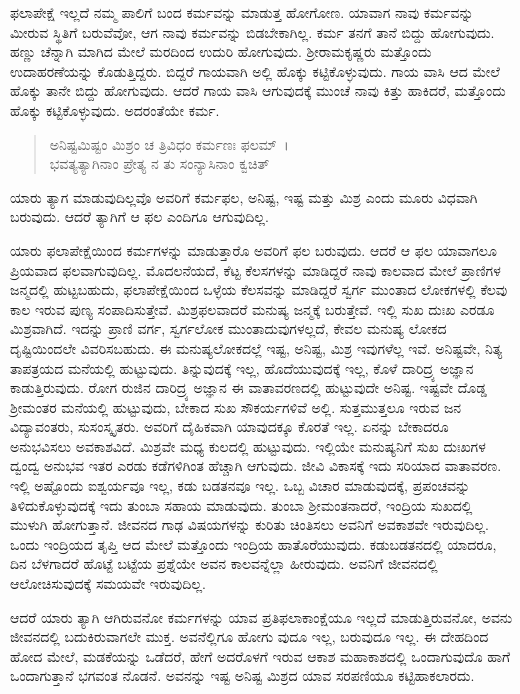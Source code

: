 ಫಲಾಪೇಕ್ಷೆ ಇಲ್ಲದೆ ನಮ್ಮ ಪಾಲಿಗೆ ಬಂದ ಕರ್ಮವನ್ನು ಮಾಡುತ್ತ ಹೋಗೋಣ. ಯಾವಾಗ ನಾವು ಕರ್ಮವನ್ನು ಮೀರುವ ಸ್ಥಿತಿಗೆ ಬರುವೆವೋ, ಆಗ ನಾವು ಕರ್ಮವನ್ನು ಬಿಡಬೇಕಾಗಿಲ್ಲ. ಕರ್ಮ ತನಗೆ ತಾನೆ ಬಿದ್ದು ಹೋಗುವುದು. ಹಣ್ಣು ಚೆನ್ನಾಗಿ ಮಾಗಿದ ಮೇಲೆ ಮರದಿಂದ ಉದುರಿ ಹೋಗುವುದು. ಶ‍್ರೀರಾಮಕೃಷ್ಣರು ಮತ್ತೊಂದು ಉದಾಹರಣೆಯನ್ನು ಕೊಡುತ್ತಿದ್ದರು. ಬಿದ್ದರೆ ಗಾಯವಾಗಿ ಅಲ್ಲಿ ಹೊಕ್ಕು ಕಟ್ಟಿಕೊಳ್ಳುವುದು. ಗಾಯ ವಾಸಿ ಆದ ಮೇಲೆ ಹೊಕ್ಕು ತಾನೇ ಬಿದ್ದು ಹೋಗುವುದು. ಆದರೆ ಗಾಯ ವಾಸಿ ಆಗುವುದಕ್ಕೆ ಮುಂಚೆ ನಾವು ಕಿತ್ತು ಹಾಕಿದರೆ, ಮತ್ತೊಂದು ಹೊಕ್ಕು ಕಟ್ಟಿಕೊಳ್ಳುವುದು. ಅದರಂತೆಯೇ ಕರ್ಮ.

\begin{verse}
ಅನಿಷ್ಟಮಿಷ್ಟಂ ಮಿಶ್ರಂ ಚ ತ್ರಿವಿಧಂ ಕರ್ಮಣಃ ಫಲಮ್~।\\ಭವತ್ಯತ್ಯಾಗಿನಾಂ ಪ್ರೇತ್ಯ ನ ತು ಸಂನ್ಯಾಸಿನಾಂ ಕ್ವಚಿತ್ 
\end{verse}

{\small ಯಾರು ತ್ಯಾಗ ಮಾಡುವುದಿಲ್ಲವೊ ಅವರಿಗೆ ಕರ್ಮಫಲ, ಅನಿಷ್ಟ, ಇಷ್ಟ ಮತ್ತು ಮಿಶ್ರ ಎಂದು ಮೂರು ವಿಧವಾಗಿ ಬರುವುದು. ಆದರೆ ತ್ಯಾಗಿಗೆ ಆ ಫಲ ಎಂದಿಗೂ ಆಗುವುದಿಲ್ಲ.}

ಯಾರು ಫಲಾಪೇಕ್ಷೆಯಿಂದ ಕರ್ಮಗಳನ್ನು ಮಾಡುತ್ತಾರೊ ಅವರಿಗೆ ಫಲ ಬರುವುದು. ಆದರೆ ಆ ಫಲ ಯಾವಾಗಲೂ ಪ್ರಿಯವಾದ ಫಲವಾಗುವುದಿಲ್ಲ. ಮೊದಲನೆಯದೆ, ಕೆಟ್ಟ ಕೆಲಸಗಳನ್ನು ಮಾಡಿದ್ದರೆ ನಾವು ಕಾಲವಾದ ಮೇಲೆ ಪ್ರಾಣಿಗಳ ಜನ್ಮದಲ್ಲಿ ಹುಟ್ಟಬಹುದು, ಫಲಾಪೇಕ್ಷೆಯಿಂದ ಒಳ್ಳೆಯ ಕೆಲಸವನ್ನು ಮಾಡಿದ್ದರೆ ಸ್ವರ್ಗ ಮುಂತಾದ ಲೋಕಗಳಲ್ಲಿ ಕೆಲವು ಕಾಲ ಇರುವ ಪುಣ್ಯ ಸಂಪಾದಿಸುತ್ತೇವೆ. ಮಿಶ್ರಫಲವಾದರೆ ಮನುಷ್ಯ ಜನ್ಮಕ್ಕೆ ಬರುತ್ತೇವೆ. ಇಲ್ಲಿ ಸುಖ ದುಃಖ ಎರಡೂ ಮಿಶ್ರವಾಗಿದೆ. ಇದನ್ನು ಪ್ರಾಣಿ ವರ್ಗ, ಸ್ವರ್ಗಲೋಕ ಮುಂತಾದುವುಗಳಲ್ಲದೆ, ಕೇವಲ ಮನುಷ್ಯ ಲೋಕದ ದೃಷ್ಟಿಯಿಂದಲೇ ವಿವರಿಸಬಹುದು. ಈ ಮನುಷ್ಯಲೋಕದಲ್ಲೆ ಇಷ್ಟ, ಅನಿಷ್ಟ, ಮಿಶ್ರ ಇವುಗಳೆಲ್ಲ ಇವೆ. ಅನಿಷ್ಟವೇ, ನಿತ್ಯ ತಾಪತ್ರಯದ ಮನೆಯಲ್ಲಿ ಹುಟ್ಟುವುದು. ತಿನ್ನುವುದಕ್ಕೆ ಇಲ್ಲ, ಹೊದೆಯುವುದಕ್ಕೆ ಇಲ್ಲ, ಕೊಳೆ ದಾರಿದ್ರ್ಯ ಅಜ್ಞಾನ ಕಾಡುತ್ತಿರುವುದು. ರೋಗ ರುಜಿನ ದಾರಿದ್ರ್ಯ ಅಜ್ಞಾನ ಈ ವಾತಾವರಣದಲ್ಲಿ ಹುಟ್ಟುವುದೇ ಅನಿಷ್ಟ. ಇಷ್ಟವೇ ದೊಡ್ಡ ಶ‍್ರೀಮಂತರ ಮನೆಯಲ್ಲಿ ಹುಟ್ಟುವುದು, ಬೇಕಾದ ಸುಖ ಸೌಕರ್ಯಗಳಿವೆ ಅಲ್ಲಿ. ಸುತ್ತಮುತ್ತಲೂ ಇರುವ ಜನ ವಿದ್ಯಾವಂತರು, ಸುಸಂಸ್ಕೃತರು. ಅವರಿಗೆ ದೈಹಿಕವಾಗಿ ಯಾವುದಕ್ಕೂ ಕೊರತೆ ಇಲ್ಲ. ಏನನ್ನು ಬೇಕಾದರೂ ಅನುಭವಿಸಲು ಅವಕಾಶವಿದೆ. ಮಿಶ್ರವೇ ಮಧ್ಯ ಕುಲದಲ್ಲಿ ಹುಟ್ಟುವುದು. ಇಲ್ಲಿಯೇ ಮನುಷ್ಯನಿಗೆ ಸುಖ ದುಃಖಗಳ ದ್ವಂದ್ವ ಅನುಭವ ಇತರ ಎರಡು ಕಡೆಗಳಿಗಿಂತ ಹೆಚ್ಚಾಗಿ ಆಗುವುದು. ಜೀವಿ ವಿಕಾಸಕ್ಕೆ ಇದು ಸರಿಯಾದ ವಾತಾವರಣ. ಇಲ್ಲಿ ಅಷ್ಟೊಂದು ಐಶ್ವರ್ಯವೂ ಇಲ್ಲ, ಕಡು ಬಡತನವೂ ಇಲ್ಲ. ಒಬ್ಬ ವಿಚಾರ ಮಾಡುವುದಕ್ಕೆ, ಪ್ರಪಂಚವನ್ನು ತಿಳಿದುಕೊಳ್ಳುವುದಕ್ಕೆ ಇದು ತುಂಬಾ ಸಹಾಯ ಮಾಡುವುದು. ತುಂಬಾ ಶ‍್ರೀಮಂತನಾದರೆ, ಇಂದ್ರಿಯ ಸುಖದಲ್ಲಿ ಮುಳುಗಿ ಹೋಗುತ್ತಾನೆ. ಜೀವನದ ಗಾಢ ವಿಷಯಗಳನ್ನು ಕುರಿತು ಚಿಂತಿಸಲು ಅವನಿಗೆ ಅವಕಾಶವೇ ಇರುವುದಿಲ್ಲ. ಒಂದು ಇಂದ್ರಿಯದ ತೃಪ್ತಿ ಆದ ಮೇಲೆ ಮತ್ತೊಂದು ಇಂದ್ರಿಯ ಹಾತೊರೆಯುವುದು. ಕಡುಬಡತನದಲ್ಲಿ ಯಾದರೂ, ದಿನ ಬೆಳಗಾದರೆ ಹೊಟ್ಟೆ ಬಟ್ಟೆಯ ಪ್ರಶ್ನೆಯೇ ಅವನ ಕಾಲವನ್ನೆಲ್ಲಾ ಹೀರುವುದು. ಅವನಿಗೆ ಜೀವನದಲ್ಲಿ ಆಲೋಚಿಸುವುದಕ್ಕೆ ಸಮಯವೇ ಇರುವುದಿಲ್ಲ.

ಆದರೆ ಯಾರು ತ್ಯಾಗಿ ಆಗಿರುವನೋ ಕರ್ಮಗಳನ್ನು ಯಾವ ಪ್ರತಿಫಲಾಕಾಂಕ್ಷೆಯೂ ಇಲ್ಲದೆ ಮಾಡುತ್ತಿರುವನೋ, ಅವನು ಜೀವನದಲ್ಲಿ ಬದುಕಿರುವಾಗಲೇ ಮುಕ್ತ. ಅವನೆಲ್ಲಿಗೂ ಹೋಗು ವುದೂ ಇಲ್ಲ, ಬರುವುದೂ ಇಲ್ಲ. ಈ ದೇಹದಿಂದ ಹೋದ ಮೇಲೆ, ಮಡಕೆಯನ್ನು ಒಡೆದರೆ, ಹೇಗೆ ಅದರೊಳಗೆ ಇರುವ ಆಕಾಶ ಮಹಾಕಾಶದಲ್ಲಿ ಒಂದಾಗುವುದೊ ಹಾಗೆ ಒಂದಾಗುತ್ತಾನೆ ಭಗವಂತ ನೊಡನೆ. ಅವನನ್ನು ಇಷ್ಟ ಅನಿಷ್ಟ ಮಿಶ್ರದ ಯಾವ ಸರಪಣಿಯೂ ಕಟ್ಟಿಹಾಕಲಾರದು.

